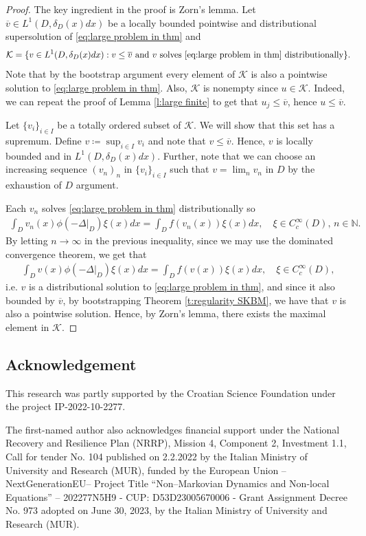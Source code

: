 \documentclass[12pt,a4paper,onecolumn]{amsart}
\theoremstyle{definition}
\newcommand{\N}{\mathbb{N}}
\newcommand{\1}{\mathbf 1}
\newcommand{\LLL}{L^1(D,\de(x)dx)}
\newcommand{\KK}{\mathcal{K}}
\newcommand{\Lo}{\phi(-\left.\Delta\right\vert_{D})}
\newcommand{\de}{\delta_D}
\numberwithin{equation}{section}
\begin{document}
\begin{proof}
    The key ingredient in the proof is Zorn's lemma. Let $\overline v \in \LLL$ be a locally bounded pointwise and distributional supersolution of \eqref{eq:large problem in thm} and 
    $$\KK=\{v\in \LLL:v\le \overline v\text{ and $v$ solves \eqref{eq:large problem in thm} distributionally}\}.$$
    Note that by the bootstrap argument every element of $\KK$ is also a pointwise solution to \eqref{eq:large problem in thm}. Also, $\KK$ is nonempty since $u\in \KK$. Indeed, we can repeat the proof of Lemma \ref{l:large finite} to get that $u_j\le \overline v$, hence $u\le \overline v$.
    
    Let $\{v_i\}_{i\in I}$ be a totally ordered subset of $\KK$. We will show that this set has a supremum. Define $v\coloneqq \sup_{i\in I} v_i$ and note that $v\le \overline v$. Hence, $v$ is locally bounded and in $\LLL$. Further, note that we can choose an increasing sequence $(v_n)_n$ in $\{v_i\}_{i\in I}$ such that $v=\lim_n v_n$ in $D$ by the exhaustion of $D$ argument.

    Each $v_n$ solves \eqref{eq:large problem in thm} distributionally so 
     \begin{align*}
		\int_D v_n(x) \Lo\xi(x)dx=\int_D f(v_n(x)) \xi(x)dx,\quad \xi\in C_c^\infty(D),\,n\in \N.
	\end{align*}
    By letting $n\to\infty$ in the previous inequality, since we may use the dominated convergence theorem, we get that
    \begin{align*}
		\int_D v(x) \Lo\xi(x)dx=\int_D f(v(x)) \xi(x)dx,\quad \xi\in C_c^\infty(D),
	\end{align*}
    i.e. $v$ is a distributional solution to \eqref{eq:large problem in thm}, and since it also bounded by $\overline v$, by bootstrapping Theorem \ref{t:regularity SKBM}, we have that $v$ is also a pointwise solution. Hence, by Zorn's lemma, there exists the maximal element in $\KK$.
\end{proof}



\subsection*{Acknowledgement}
This research was partly supported by the Croatian Science Foundation under the project IP-2022-10-2277.

The first-named author also acknowledges financial support under the National Recovery and Resilience Plan (NRRP), Mission 4, Component 2, Investment 1.1, Call for tender No. 104 published on 2.2.2022 by the Italian Ministry of University and Research (MUR), funded by the European Union – NextGenerationEU– Project Title “Non–Markovian Dynamics and Non-local Equations” – 202277N5H9 - CUP: D53D23005670006 - Grant Assignment Decree No. 973 adopted on June 30, 2023, by the Italian Ministry of University and Research (MUR).
\end{document}
